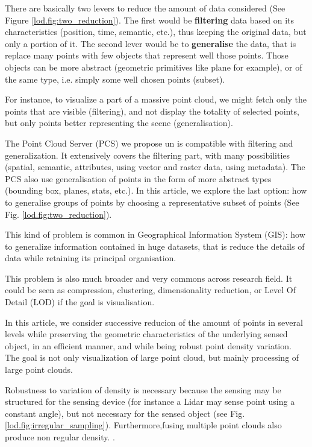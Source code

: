 	
	There are basically two levers to reduce the amount of data considered (See Figure \ref{lod.fig:two_reduction}). The first would be \textbf{filtering} data based on its characteristics (position, time, semantic, etc.), thus keeping the original data, but only a portion of it.
	The second lever would be to \textbf{generalise} the data, that is replace many points with few objects that represent  well those points. Those objects can be more abstract (geometric primitives like plane for example), or of the same type, i.e. simply some well chosen points (subset).
	
	For instance, to visualize a part of a massive point cloud, we might fetch only the points that are visible (filtering),
	and not display the totality of selected points, but only points better representing the scene (generalisation).
	
	The Point Cloud Server (PCS) we propose un \cite{cura2015} is compatible with filtering and generalization. It extensively covers the filtering part, with many possibilities (spatial, semantic, attributes, using vector and raster data, using metadata). The PCS also use generalisation of points in the form of more abstract types (bounding box, planes, stats, etc.).
	In this article, we explore the last option: how to generalise groups of points by choosing a representative subset of points (See Fig. \ref{lod.fig:two_reduction}).
	
	This kind of problem is common in Geographical Information System (GIS): how to generalize information contained in huge datasets, that is reduce the details of data while retaining its principal organisation.
	
	This problem is also much broader and very commons across research field. It could be seen as compression, clustering, dimensionality reduction, or Level Of Detail (LOD) if the goal is visualisation.
	
	In this article, we consider successive reducion of the amount of points in several levels while preserving the geometric characteristics of the underlying sensed object, in an efficient manner, and while being robust point density variation. The goal is not only visualization of large point cloud, but mainly processing of large point clouds.
	
	Robustness to variation of density is necessary because the sensing may be structured for the sensing device (for instance a Lidar may sense point using a constant angle), but not necessary for the sensed object (see Fig. \ref{lod.fig:irregular_sampling}). Furthermore,fusing multiple point clouds also produce non regular density.
	.
	

